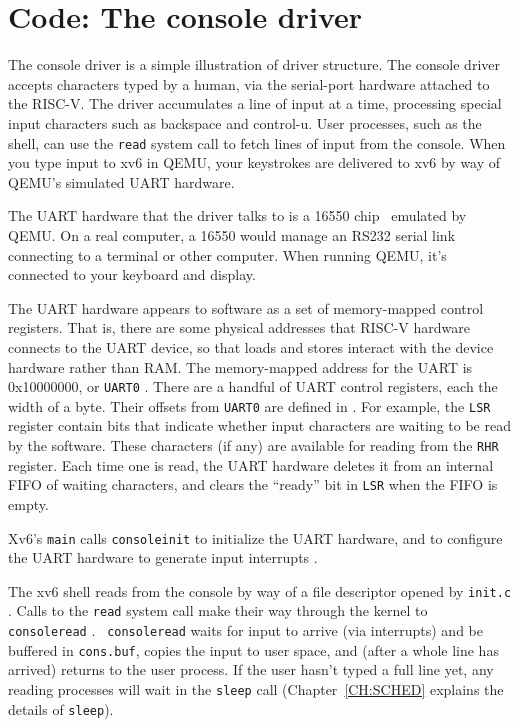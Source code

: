 \section{Code: The console driver}

The console driver is a simple illustration of driver structure. The
console driver accepts characters typed by a human, via the 
serial-port hardware attached to the RISC-V. The driver accumulates a
line of input at a time, processing special input characters such as
backspace and control-u. User processes, such as the shell, can use
the {\tt read} system call to fetch lines of input from the console.
When you type input to xv6 in QEMU, your keystrokes are delivered to
xv6 by way of QEMU's simulated UART hardware.

The UART hardware that the driver talks to is a 16550
chip~\cite{ns16550a} emulated by QEMU. On a real computer, a 16550
would manage an RS232 serial link connecting to a terminal or other
computer. When running QEMU, it's connected to your keyboard and
display.

The UART hardware appears to software as a set of memory-mapped
control registers. That is, there are some physical addresses that 
RISC-V hardware connects to the UART device, so that loads and stores
interact with the device hardware rather than RAM.
The memory-mapped address for the UART is 0x10000000, or {\tt UART0}
.
There are a handful of UART control registers, each the width
of a byte. Their offsets from {\tt UART0} are defined in
. For example, the
{\tt LSR} register contain bits that indicate whether input
characters are waiting to be read by the software. These
characters (if any) are available for reading from the
{\tt RHR} register. Each time one is read, the UART hardware
deletes it from an internal FIFO of waiting characters, and
clears the ``ready'' bit in {\tt LSR} when the FIFO is empty.

Xv6's {\tt main} calls {\tt consoleinit}
 to initialize the UART
hardware, and to configure the UART hardware to generate input
interrupts .

The xv6 shell reads from the console by way of a file descriptor
opened by {\tt init.c} . Calls to
the {\tt read} system call make their way through the kernel to {\tt
  consoleread} . {\tt
  consoleread} waits for input to arrive (via interrupts) and be
buffered in {\tt cons.buf}, copies the input to user space, and (after
a whole line has arrived) returns to the user process. If the user
hasn't typed a full line yet, any reading processes will wait in the
{\tt sleep} call
(Chapter~\ref{CH:SCHED} explains the details of {\tt sleep}).

